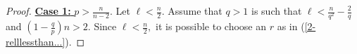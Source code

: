 \documentclass[12pt]{amsart}
\renewcommand{\1}{{\mathbf 1}}
\newcommand{\eps}{{\varepsilon}}
\theoremstyle{others}
\numberwithin{equation}{section}
\begin{document}
\begin{proof} 
\underline{{\bf Case 1:} $p > \frac{n}{n-2}.$} 
Let $\ell < \frac{n}{2}.$ %
Assume that $q > 1$ is such that $\ell < \frac{n}{q^2} - \frac{2}{q} $ and $\left( 1 - \frac{q}{p} \right) n > 2.$
Since $\ell < \frac{n}{2},$ it is possible to choose an $r$ as in (\ref{2-relllessthan...}).

    \vspace{2mm}
    

\end{proof}
\end{document}

